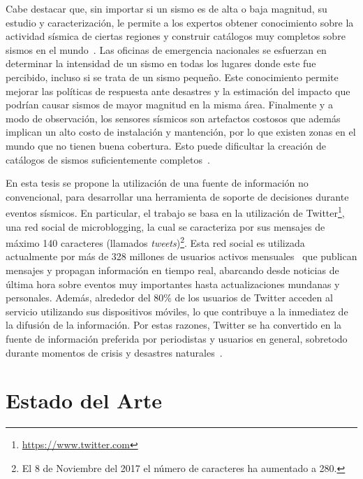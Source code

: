 Cabe destacar que, sin importar si un sismo es de alta o baja magnitud, su estudio y caracterización, le permite a los expertos obtener conocimiento sobre la actividad sísmica de ciertas regiones y construir catálogos muy completos sobre sismos en el mundo~\cite{stein2009introduction}.
%
Las oficinas de emergencia nacionales se esfuerzan en determinar la intensidad de un sismo en todas los lugares donde este fue percibido, incluso si se trata de un sismo pequeño. 
%
Este conocimiento permite mejorar las políticas de respuesta ante desastres y la estimación del impacto que podrían causar sismos de mayor magnitud en la misma área.
%
Finalmente y a modo de observación, los sensores sísmicos son artefactos costosos que además implican un alto costo de instalación y mantención, por lo que existen zonas en el mundo que no tienen buena cobertura. Esto puede dificultar la creación de catálogos de sismos suficientemente completos~\cite{usgs,shoa,onemi,wyss2009delay}.


En esta tesis se propone la utilización de una fuente de información no convencional, para desarrollar una herramienta de soporte de decisiones durante eventos sísmicos.
%
En particular, el trabajo se basa en la utilización de Twitter\footnote{\url{https://www.twitter.com}}, una red social de microblogging, la cual se caracteriza por sus mensajes de máximo 140 caracteres (llamados {\em tweets})\footnote{El 8 de Noviembre del 2017 el número de caracteres ha aumentado a 280.}.
%
Esta red social es utilizada actualmente por más de 328 millones de usuarios activos mensuales~\cite{abouttwitter} que publican mensajes y propagan información en tiempo real, abarcando desde noticias de última hora sobre eventos muy importantes hasta actualizaciones mundanas y personales.
%
Además, alrededor del 80\% de los usuarios de Twitter acceden al servicio utilizando sus dispositivos móviles, lo que contribuye a la inmediatez de la difusión de la información. 
%
Por estas razones, Twitter se ha convertido en la fuente de información preferida por periodistas y usuarios en general, sobretodo durante momentos de crisis y desastres naturales~\cite{castillo2016bcd,Mendoza:2010:TUC:1964858.1964869}.


\section{Estado del Arte}

